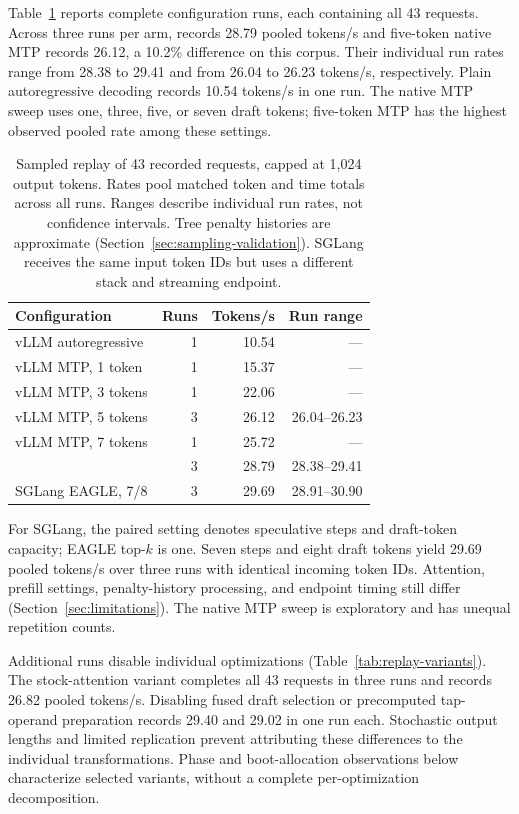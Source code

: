 Table~\ref{tab:request-replay} reports complete configuration runs, each containing all 43 requests. Across three runs per arm, \sys{} records 28.79 pooled tokens/s and five-token native MTP records 26.12, a 10.2\% difference on this corpus. Their individual run rates range from 28.38 to 29.41 and from 26.04 to 26.23 tokens/s, respectively. Plain autoregressive decoding records 10.54 tokens/s in one run. The native MTP sweep uses one, three, five, or seven draft tokens; five-token MTP has the highest observed pooled rate among these settings.

\begin{table}[t]
\caption{Sampled replay of 43 recorded requests, capped at 1,024 output tokens. Rates pool matched token and time totals across all runs. Ranges describe individual run rates, not confidence intervals. Tree penalty histories are approximate (Section~\ref{sec:sampling-validation}). SGLang receives the same input token IDs but uses a different stack and streaming endpoint.}
\label{tab:request-replay}
\centering\small
\begin{tabular}{@{}lrrr@{}}
\toprule
Configuration & Runs & Tokens/s & Run range \\
\midrule
vLLM autoregressive & 1 & 10.54 & --- \\
vLLM MTP, 1 token & 1 & 15.37 & --- \\
vLLM MTP, 3 tokens & 1 & 22.06 & --- \\
vLLM MTP, 5 tokens & 3 & 26.12 & 26.04--26.23 \\
vLLM MTP, 7 tokens & 1 & 25.72 & --- \\
\sys{} & 3 & 28.79 & 28.38--29.41 \\
\midrule
SGLang EAGLE, 7/8 & 3 & 29.69 & 28.91--30.90 \\
\bottomrule
\end{tabular}
\end{table}

For SGLang, the paired setting denotes speculative steps and draft-token capacity; EAGLE top-$k$ is one. Seven steps and eight draft tokens yield 29.69 pooled tokens/s over three runs with identical incoming token IDs. Attention, prefill settings, penalty-history processing, and endpoint timing still differ (Section~\ref{sec:limitations}). The native MTP sweep is exploratory and has unequal repetition counts.

Additional runs disable individual \sys{} optimizations (Table~\ref{tab:replay-variants}). The stock-attention variant completes all 43 requests in three runs and records 26.82 pooled tokens/s. Disabling fused draft selection or precomputed tap-operand preparation records 29.40 and 29.02 in one run each. Stochastic output lengths and limited replication prevent attributing these differences to the individual transformations. Phase and boot-allocation observations below characterize selected variants, without a complete per-optimization decomposition.

